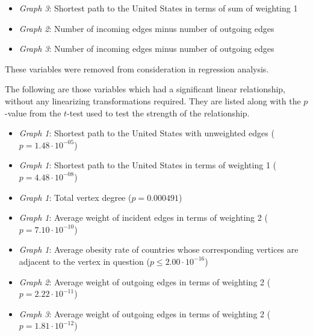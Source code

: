 \documentclass[oneside,12pt]{report}
\begin{document}
\begin{itemize}
\item \textit{Graph 3}: Shortest path to the United States in terms of sum of weighting 1
\item \textit{Graph 2}: Number of incoming edges minus number of outgoing edges
\item \textit{Graph 3}: Number of incoming edges minus number of outgoing edges
\end{itemize}

\noindent These variables were removed from consideration in regression analysis.

The following are those variables which had a significant linear relationship, without any linearizing transformations required. They are listed along with the $p$-value from the $t$-test used to test the strength of the relationship.

\begin{itemize}
\item \emph{Graph 1}: Shortest path to the United States with unweighted edges (\begin{math}p=1.48\cdot10^{-05}\end{math})
\item \emph{Graph 1}: Shortest path to the United States in terms of weighting 1 (\begin{math}p=4.48\cdot10^{-08}\end{math})
\item \emph{Graph 1}: Total vertex degree (\begin{math}p=0.000491\end{math})
\item \emph{Graph 1}: Average weight of incident edges in terms of weighting 2 (\begin{math}p=7.10\cdot10^{-10}\end{math})
\item \emph{Graph 1}: Average obesity rate of countries whose corresponding vertices are adjacent to the vertex in question (\begin{math}p\leq2.00\cdot10^{-16}\end{math})
\item \emph{Graph 2}: Average weight of outgoing edges in terms of weighting 2 (\begin{math}p=2.22\cdot10^{-11}\end{math})
\item \emph{Graph 3}: Average weight of outgoing edges in terms of weighting 2 (\begin{math}p=1.81\cdot10^{-12}\end{math})
\end{itemize}
\end{document}
